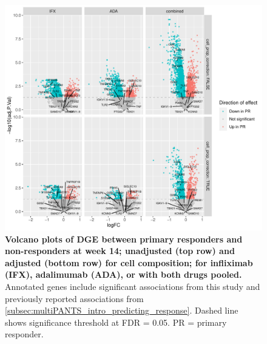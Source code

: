 \begin{figure}
    \centering
    \includegraphics[width=1.0\textwidth,page=1]{mainmatter/figures/chapter_04/plot_gene_set_enrichment.dge_result_volcano_simple_C_3RI_3NI,C_3RA_3NA,C_3R_3N.pdf}
    \caption{
        \textbf{Volcano plots of \gls{DGE} between primary responders and non-responders at week 14; unadjusted (top row) and adjusted (bottom row) for cell composition; for infliximab (IFX), adalimumab (ADA), or with both drugs pooled.}
        Annotated genes include significant associations from this study and previously reported associations from \autoref{subsec:multiPANTS_intro_predicting_response}.
        Dashed line shows significance threshold at FDR = 0.05.
        PR = primary responder.
    }
    \label{fig:multipants_dge_volcano_week_14_R_N}
\end{figure}

